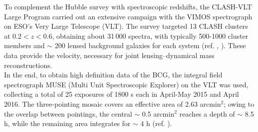 To complement the Hubble survey with spectroscopic redshifts, the CLASH-VLT Large Program carried out an extensive campaign with the VIMOS spectrograph on ESO’s Very Large Telescope (VLT).  
The survey targeted 13 CLASH clusters at $0.2 < z < 0.6$, obtaining about 31\,000 spectra, with typically 500-1000 cluster members and $\sim$ 200 lensed background galaxies for each system (ref. \cite{Rosati2014_Messenger}, \cite{clashvlt_site}).
These data provide the velocity, necessary for joint lensing–dynamical mass reconstructions.\\ In the end, to obtain high definition data of the BCG, the integral field spectrograph MUSE (Multi Unit Spectroscopic Explorer) on the VLT was used, collecting a total of 25 exposures of 1800 s each in April-May 2015 and April 2016. The three-pointing mosaic covers an effective area of 2.63 arcmin$^{2}$; owing to the overlap between pointings, the central $\sim$ 0.5 arcmin$^{2}$ reaches a depth of $\sim$ 8.5 h, while the remaining area integrates for $\sim$ 4 h (ref. \cite{MUSE_Caminha_2017}).\\


